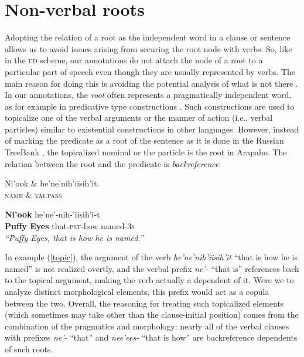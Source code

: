 \documentclass[11pt]{article}
\begin{document}
\section{Non-verbal roots} \label{backref}
Adopting the relation of a root as the independent word in a clause or sentence allows us to avoid issues arising from securing the root node with verbs. So, like in the \textsc{ud} scheme, our annotations do not attach the node of a root to a particular part of speech even though they are usually represented by verbs. The main reason for doing this is avoiding the potential analysis of what is not there \cite{Nivre2015,Hajicova2015,Osborne2015}. In our annotations, the \textit{root} often represents a pragmatically independent word, as for example in predicative type constructions \cite{Cow08}. Such constructions are used to topicalize one of the verbal arguments or the manner of action (i.e., verbal particles)
similar to existential constructions in other languages. However, instead of marking the predicate as a root of the sentence as it is done in the Russian TreeBank \cite{Marneffe2014}, the topicalized nominal or the particle is the root in Arapaho. The relation between the root and the predicate is \textit{backreference}:
\begin{exe}
\ex \label{topic}
\small
\begin{dependency}
\begin{deptext}
Ni'ook \& he'ne'nih'iisih'it.\\
\textsc{name} \& \textsc{vai.pass}\\
\end{deptext}
\end{dependency}
\begin{adjustwidth*}{-0.2in}{-0.2in}
\gll \textbf{{Ni'ook}} {he'ne'-nih-'iisih'i-t}\\
\textbf{{Puffy Eyes}} {that-\textsc{pst}-how named-\textsc{3s}}\\
\trans \textit{``Puffy Eyes, that is how he is named.''}
\end{adjustwidth*}
\end{exe}
\normalsize
In example (\ref{topic}), the argument of the verb \textit{he'ne'nih'iisih'it} ``that is how he is named'' is not realized overtly, and the verbal prefix \textit{ne'-} ``that is'' references back to the topical argument, making the verb actually a dependent of it. Were we to analyze distinct morphological elements, this prefix would act as a copula between the two. Overall, the reasoning for treating such topicalized elements (which sometimes may take other than the clause-initial position) comes from the combination of the pragmatics and morphology: nearly all of the verbal clauses with prefixes \textit{ne'-} ``that'' and \textit{nee'ees-} ``that is how'' are backreference dependents of such roots. 
\end{document}
